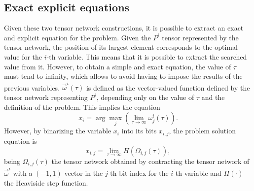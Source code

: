\documentclass[%
 reprint,
 amsmath,amssymb,
 aps,
 pra,showkeys,
]{revtex4-2}
\begin{document}
\subsection{Exact explicit equations}\label{ssec: exact explicit}
Given these two tensor network constructions, it is possible to extract an exact and explicit equation for the problem. Given the $P^i$ tensor represented by the tensor network, the position of its largest element corresponds to the optimal value for the $i$-th variable. This means that it is possible to extract the searched value from it. However, to obtain a simple and exact equation, the value of $\tau$ must tend to infinity, which allows to avoid having to impose the results of the previous variables. $\vec{\omega}^i(\tau)$ is defined as the vector-valued function defined by the tensor network representing $P^i$, depending only on the value of $\tau$ and the definition of the problem. This implies the equation
\begin{equation}
    x_i =\arg \max_{j} \left(\lim_{\tau\rightarrow\infty} \omega^i_j(\tau)\right).
\end{equation}
However, by binarizing the variable $x_i$ into its bits $x_{i,j}$, the problem solution equation is
\begin{equation}
    x_{i,j} = \lim_{\tau\rightarrow\infty} H(\Omega_{i,j}(\tau)),
\end{equation}
being $\Omega_{i,j}(\tau)$ the tensor network obtained by contracting the tensor network of $\vec{\omega}^i$ with a $(-1,1)$ vector in the $j$-th bit index for the $i$-th variable and $H(\cdot)$ the Heaviside step function.
\end{document}

